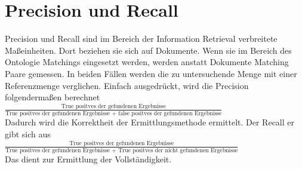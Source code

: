 	\section{Precision und Recall}
	Precision und Recall sind im Bereich der Information Retrieval verbreitete
	Maßeinheiten. Dort beziehen sie sich auf Dokumente.
	Wenn sie im Bereich des Ontologie Matchings eingesetzt werden, werden anstatt Dokumente Matching Paare
	gemessen. In beiden Fällen
	werden die zu untersuchende Menge mit einer Referenzmenge
	verglichen.\cite{Euz07} Einfach ausgedrückt, wird die Precision folgendermaßen berechnet\\
	\( \frac{\text{True positves der gefundenen Ergebnisse}}{\text{True
	positves der gefundenen Ergebnisse + false positves der gefundenen Ergebnisse}} \)
	\\
	Dadurch wird die Korrektheit der Ermittlungsmethode ermittelt\cite{Euz07}.
	Der Recall er gibt sich aus\\
	\( \frac{\text{True positves der gefundenen
	Ergebnisse}}{\text{True positves der gefundenen Ergebnisse + True positves der
	nicht gefundenen Ergebnisse}} \)
	\\
	Das dient zur Ermittlung der Vollständigkeit.\cite{Euz07}
	
	\cleardoublepage
	\pagebreak[4] 
